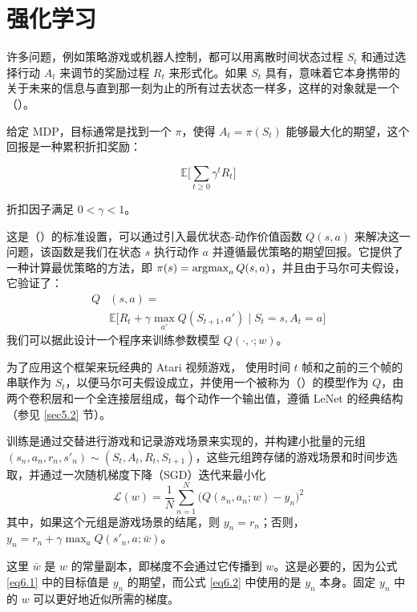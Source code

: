 \section{强化学习}\label{sec6.7}

许多问题，例如策略游戏或机器人控制，都可以用离散时间状态过程 $S_t$ 和通过选择行动 $A_t$ 来调节的奖励过程 $R_t$ 来形式化。如果 $S_t$ 具有，意味着它本身携带的关于未来的信息与直到那一刻为止的所有过去状态一样多，这样的对象就是一个（）。

给定 MDP，目标通常是找到一个 $\pi$，使得 $A_t = \pi(S_t)$ 能够最大化的期望，这个回报是一种累积折扣奖励：

\[\mathbb{E}\Bigg[\sum_{t \ge 0}\gamma^tR_t\Bigg]\]

折扣因子满足 $0 < \gamma < 1$。

这是（）的标准设置，可以通过引入最优状态-动作价值函数 $Q(s,a)$ 来解决这一问题，该函数是我们在状态 $s$ 执行动作 $a$ 并遵循最优策略的期望回报。它提供了一种计算最优策略的方法，即 $\pi(s) = \argmax_aQ(s,a)$，并且由于马尔可夫假设，它验证了：
\begin{equation}
    \begin{aligned}
    Q&(s,a) = \\
    &\mathbb{E}\Big[R_t +\gamma \underset{a'} \max Q(S_{t+1},a') \mid S_t = s,A_t = a\Big] \label{eq6.1}
    \end{aligned}
\end{equation}
我们可以据此设计一个程序来训练参数模型 $Q(\cdot, \cdot ;w)$。

为了应用这个框架来玩经典的 Atari 视频游戏，\cite{nature14236} 使用时间 $t$ 帧和之前的三个帧的串联作为 $S_t$，以便马尔可夫假设成立，并使用一个被称为（）的模型作为 $Q$，由两个卷积层和一个全连接层组成，每个动作一个输出值，遵循 LeNet 的经典结构（参见 \ref{sec5.2} 节）。

训练是通过交替进行游戏和记录游戏场景来实现的，并构建小批量的元组 $(s_n,a_n,r_n,s'_n)\sim(S_t,A_t,R_t,S_{t+1})$，这些元组跨存储的游戏场景和时间步选取，并通过一次随机梯度下降（SGD）迭代来最小化
\begin{equation}
    \mathcal{L}(w)= \frac{1}{N}\sum_{n=1}^{N}\big(Q(s_n,a_n;w)-y_n\big)^2 \label{eq6.2}
\end{equation}
其中，如果这个元组是游戏场景的结尾，则 $y_n = r_n$；否则，$y_n = r_n + \gamma \max_aQ(s'_n,a; \bar{w})$。

这里 $\bar{w}$ 是 $w$ 的常量副本，即梯度不会通过它传播到 $w$。这是必要的，因为公式 \ref{eq6.1} 中的目标值是 $y_n$ 的期望，而公式 \ref{eq6.2} 中使用的是 $y_n$ 本身。固定 $y_n$ 中的 $w$ 可以更好地近似所需的梯度。

